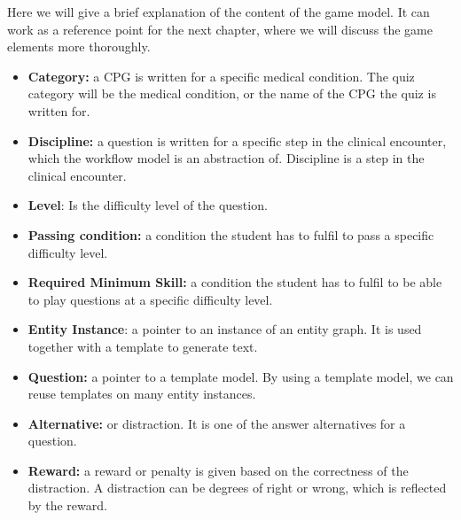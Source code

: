 Here we will give a brief explanation of the content of the game model. It can work as a reference point for the next chapter, where we will discuss the game elements more thoroughly.
\begin{itemize}
	\item \textbf{Category:} a CPG is written for a specific medical condition. The quiz category will be the medical condition, or the name of the CPG the quiz is written for.
	\item \textbf{Discipline:} a question is written for a specific step in the clinical encounter, which the workflow model is an abstraction of. Discipline is a step in the clinical encounter.
	\item \textbf{Level}: Is the difficulty level of the question.
	\item \textbf{Passing condition:} a condition the student has to fulfil to pass a specific  difficulty level.
	\item \textbf{Required Minimum Skill:} a condition the student has to fulfil to be able to play questions at a specific difficulty level.
	\item\textbf{Entity Instance}: a pointer to an instance of an entity graph. It is used together with a template to generate text.
	\item \textbf{Question:} a pointer to a template model. By using a template model, we can reuse templates on many entity instances.
	\item \textbf{Alternative:} or distraction. It is one of the answer alternatives for a question. 
	\item \textbf{Reward:} a reward or penalty is given based on the correctness of the distraction. A distraction can be degrees of right or wrong, which is reflected by the reward.	
\end{itemize} 


